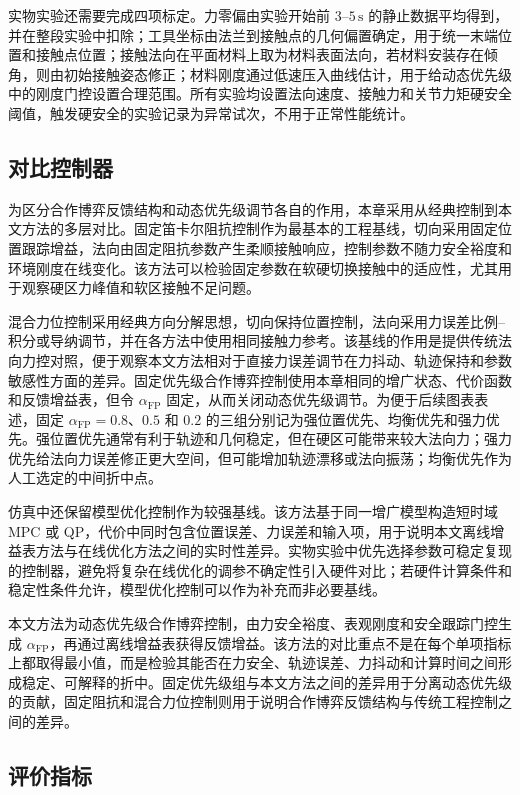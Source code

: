 实物实验还需要完成四项标定。力零偏由实验开始前 $3$--$5\,\mathrm{s}$ 的静止数据平均得到，并在整段实验中扣除；工具坐标由法兰到接触点的几何偏置确定，用于统一末端位置和接触点位置；接触法向在平面材料上取为材料表面法向，若材料安装存在倾角，则由初始接触姿态修正；材料刚度通过低速压入曲线估计，用于给动态优先级中的刚度门控设置合理范围。所有实验均设置法向速度、接触力和关节力矩硬安全阈值，触发硬安全的实验记录为异常试次，不用于正常性能统计。

\subsection{对比控制器}
\label{subsec:ch3_baselines}

为区分合作博弈反馈结构和动态优先级调节各自的作用，本章采用从经典控制到本文方法的多层对比。固定笛卡尔阻抗控制作为最基本的工程基线，切向采用固定位置跟踪增益，法向由固定阻抗参数产生柔顺接触响应，控制参数不随力安全裕度和环境刚度在线变化。该方法可以检验固定参数在软硬切换接触中的适应性，尤其用于观察硬区力峰值和软区接触不足问题。

混合力位控制采用经典方向分解思想，切向保持位置控制，法向采用力误差比例--积分或导纳调节，并在各方法中使用相同接触力参考。该基线的作用是提供传统法向力控对照，便于观察本文方法相对于直接力误差调节在力抖动、轨迹保持和参数敏感性方面的差异。固定优先级合作博弈控制使用本章相同的增广状态、代价函数和反馈增益表，但令 $\alpha_{\mathrm{FP}}$ 固定，从而关闭动态优先级调节。为便于后续图表表述，固定 $\alpha_{\mathrm{FP}}=0.8$、$0.5$ 和 $0.2$ 的三组分别记为强位置优先、均衡优先和强力优先。强位置优先通常有利于轨迹和几何稳定，但在硬区可能带来较大法向力；强力优先给法向力误差修正更大空间，但可能增加轨迹漂移或法向振荡；均衡优先作为人工选定的中间折中点。

仿真中还保留模型优化控制作为较强基线。该方法基于同一增广模型构造短时域 MPC 或 QP，代价中同时包含位置误差、力误差和输入项，用于说明本文离线增益表方法与在线优化方法之间的实时性差异。实物实验中优先选择参数可稳定复现的控制器，避免将复杂在线优化的调参不确定性引入硬件对比；若硬件计算条件和稳定性条件允许，模型优化控制可以作为补充而非必要基线。

本文方法为动态优先级合作博弈控制，由力安全裕度、表观刚度和安全跟踪门控生成 $\alpha_{\mathrm{FP}}$，再通过离线增益表获得反馈增益。该方法的对比重点不是在每个单项指标上都取得最小值，而是检验其能否在力安全、轨迹误差、力抖动和计算时间之间形成稳定、可解释的折中。固定优先级组与本文方法之间的差异用于分离动态优先级的贡献，固定阻抗和混合力位控制则用于说明合作博弈反馈结构与传统工程控制之间的差异。

\subsection{评价指标}
\label{subsec:ch3_metrics}

